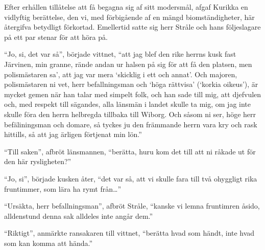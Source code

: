 Efter erhållen tillåtelse att få begagna sig af sitt modersmål, afgaf
Kurikka en vidlyftig berättelse, den vi, med förbigående af en mängd
biomständigheter, här återgifva betydligt förkortad. Emellertid satte
sig herr Stråle och hans följeslagare på ett par stenar för att höra på.

``Jo, si, det var så'', började vittnet, ``att jag blef den rike herrns
kusk fast Järvinen, min granne, rände andan ur halsen på sig för att få
den platsen, men polismästaren sa', att jag var mera `skicklig i ett och
annat'. Och majoren, polismästaren ni vet, herr befallningsman och `höga
rättvisa' (`korkia oikeus'), är mycket gemen när han talar med simpelt
folk, och han sade till mig, att djefvulen och, med respekt till
sägandes, alla länsmän i landet skulle ta mig, om jag inte skulle föra
den herrn helbregda tillbaka till Wiborg. Och såsom ni ser, höge herr
befäliningsman och domare, så tyckes ju den främmande herrn vara kry och
rask hittills, så att jag ärligen förtjenat min lön.''

``Till saken'', afbröt länsmannen, ``berätta, huru kom det till att ni
råkade ut för den här rysligheten?''

``Jo, si'', började kusken åter, ``det var så, att vi skulle fara till
två ohyggligt rika fruntimmer, som lära ha rymt från\ldots{}''

``Ursäkta, herr befallningsman'', afbröt Stråle, ``kanske vi lemna
fruntimren åsido, alldenstund denna sak alldeles inte angår dem.''

``Riktigt'', anmärkte ransakaren till vittnet, ``berätta hvad som händt,
inte hvad som kan komma att hända.''

